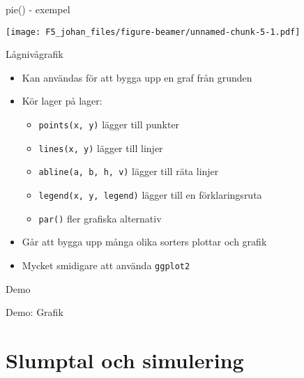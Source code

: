 \documentclass[
  11pt,
  ignorenonframetext,
  handout]{beamer}
\newenvironment{Shaded}{\begin{snugshade}}{\end{snugshade}}
\newcommand{\FunctionTok}[1]{\textcolor[rgb]{0.13,0.29,0.53}{\textbf{#1}}}
\newcommand{\NormalTok}[1]{#1}
\newcommand{\OtherTok}[1]{\textcolor[rgb]{0.56,0.35,0.01}{#1}}
\newcommand{\SpecialCharTok}[1]{\textcolor[rgb]{0.81,0.36,0.00}{\textbf{#1}}}
\providecommand{\tightlist}{%
  \setlength{\itemsep}{0pt}\setlength{\parskip}{0pt}}
\begin{document}
\begin{frame}[fragile]{pie() - exempel}
\label{pie---exempel}
\begin{Shaded}
\end{Shaded}

\texttt{[image: F5\_johan\_files/figure-beamer/unnamed-chunk-5-1.pdf]}
\end{frame}

\begin{frame}{Lågnivågrafik}
\label{luxe5gnivuxe5grafik}
\begin{itemize}
\tightlist
\item
  Kan användas för att bygga upp en graf från grunden
\item
  Kör lager på lager:

  \begin{itemize}
  \tightlist
  \item
    \texttt{points(x, y)} lägger till punkter
  \item
    \texttt{lines(x, y)} lägger till linjer
  \item
    \texttt{abline(a, b, h, v)} lägger till räta linjer
  \item
    \texttt{legend(x, y, legend)} lägger till en förklaringsruta
  \item
    \texttt{par()} fler grafiska alternativ
  \end{itemize}
\item
  Går att bygga upp många olika sorters plottar och grafik
\item
  Mycket smidigare att använda \texttt{ggplot2}
\end{itemize}
\end{frame}

\begin{frame}{Demo}
\label{demo}
\begin{block}{Demo: Grafik}
\label{demo-grafik}
\end{block}
\end{frame}

\section{Slumptal och simulering}\label{slumptal-och-simulering}
\end{document}

